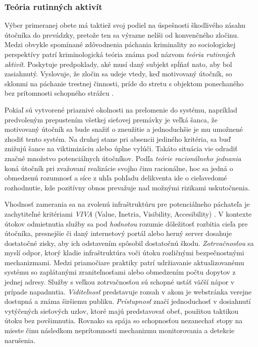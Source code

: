 \documentclass[12pt, a4paper]{article}
\begin{document}
\subsubsection{Teória rutinných aktivít}
Výber primeranej obete má taktiež svoj podiel na úspešnosti škodlivého zásahu útočníka do prevádzky,
pretože ten sa výrazne nelíši od konvenčného zločinu. Medzi obvykle spomínané zdôvodnenia páchania 
kriminality zo sociologickej perspektívy patrí kriminologická teória známa pod názvom 
\emph{teória rutinných aktivít}. Poskytuje predpoklady, aké musí daný subjekt spĺňať nato, aby bol 
zasiahnutý. Vyslovuje, že zločin sa udeje vtedy, keď motivovaný útočník, so sklonmi na páchanie trestnej 
činnosti, príde do stretu s objektom ponechaného bez prítomnosti schopného strážcu \cite{cohen-felson}.

Pokiaľ sú vytvorené priaznivé okolnosti na prelomenie do systému, napríklad predvoleným prepustením 
všetkej sieťovej premávky je veľká šanca, že motivovaný útočník sa bude snažiť o zneužitie a jednoduchšie
je mu umožnené zhodiť tento systém. Na druhej stane pri absencii jediného kritéria, sa buď znižujú šance na
viktimizáciu alebo úplne vylúči. Takáto situácia vie odradiť značné množstvo potenciálnych útočníkov.
Podľa \emph{teórie racionálneho jednania} koná útočník pri zvažovaní realizácie svojho činu racionálne,
hoc sa jedná o obmedzenú rozumnosť a síce z uhľa pohľadu delikventa ide o cieľavedomé rozhodnutie, kde 
pozitívny obnos prevažuje nad možnými rizikami uskutočnenia.

Vhodnosť zamerania sa na zvolenú infraštruktúru pre potenciálneho páchateľa je zachytiteľné kritériami 
\emph{VIVA} (Value, Inetria, Visibility, Accesibility) \cite{why-attack}. V kontexte útokov odmietnutia 
služby sa pod \emph{hodnotou} rozumie dôležitosť rozbitia cieľa pre útočníka, presnejšie či daný internetový 
portál alebo herný server dosahuje dostatočné zisky, aby ich odstavením spôsobil dostatočnú škodu. 
\emph{Zotrvačnosťou} sa myslí odpor, ktorý kladie infraštruktúra voči útoku rozličnými bezpečnostnými 
mechanizmami. Medzi priamočiare praktiky patrí udržiavanie aktualizovanému systému so zaplátanými 
zraniteľnosťami alebo obmedzením počtu dopytov z jednej adresy. Služby s veľkou zotrvačnosťou sú schopné 
ustáť väčší nápor v prípade napadnutia. \emph{Viditeľnosť} predstavuje rozsah v akom je webstránka verejne 
dostupná a známa širšiemu publiku. \emph{Prístupnosť} značí jednoduchosť v dosiahnutí vytýčených sieťových 
uzlov, ktoré majú predstavovať obeť, použitou taktikou útoku bez povšimnutia. Rovnako sa spája so 
schopnosťou nezanechať stopy na mieste činu následkom neprítomnosti mechanizmu monitorovania a detekcie 
narušenia. 
\end{document}
